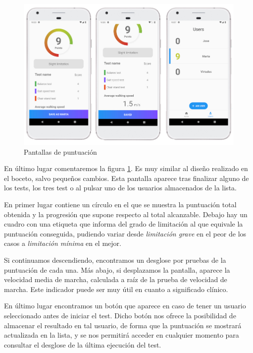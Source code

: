 \begin{figure}[H]
	\centering
	\includegraphics[scale=0.4]{imagenes/capturas_puntuacion.jpg}
	\caption{Pantallas de puntuación\label{fig:capturas_puntuacion}}
\end{figure}

En último lugar comentaremos la figura \ref{fig:capturas_puntuacion}. Es muy similar al diseño realizado en el boceto, salvo pequeños cambios. Esta pantalla aparece tras finalizar alguno de los tests, los tres test o al pulsar uno de los usuarios almacenados de la lista.

En primer lugar contiene un círculo en el que se muestra la puntuación total obtenida y la progresión que supone respecto al total alcanzable. Debajo hay un cuadro con una etiqueta que informa del grado de limitación al que equivale la puntuación conseguida, pudiendo variar desde \textit{limitación grave} en el peor de los casos a \textit{limitación mínima} en el mejor.

Si continuamos descendiendo, encontramos un desglose por pruebas de la puntuación de cada una. Más abajo, si desplazamos la pantalla, aparece la velocidad media de marcha, calculada a raíz de la prueba de velocidad de marcha. Este indicador puede ser muy útil en cuanto a significado clínico.

En último lugar encontramos un botón que aparece en caso de tener un usuario seleccionado antes de iniciar el test. Dicho botón nos ofrece la posibilidad de almacenar el resultado en tal usuario, de forma que la puntuación se mostrará actualizada en la lista, y se nos permitirá acceder en cualquier momento para consultar el desglose de la última ejecución del test.
